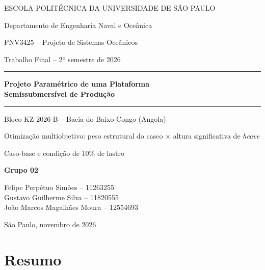 \documentclass[11pt,a4paper]{article}
\newcommand{\integrantes}{Felipe Perpétuo Simões -- 11263255\\[3pt]
  Gustavo Guilherme Silva -- 11820555\\[3pt]
  João Marcos Magalhães Moura -- 12554693}
\begin{document}
\hypersetup{pageanchor=false}
\begin{titlepage}
\centering
{\sffamily\large\color{azul} ESCOLA POLITÉCNICA DA UNIVERSIDADE DE SÃO PAULO\par}
{\sffamily\color{cinza} Departamento de Engenharia Naval e Oceânica\par}
\vspace{3cm}
{\sffamily\Large PNV3425 -- Projeto de Sistemas Oceânicos\par}
{\sffamily\color{cinza} Trabalho Final -- 2º semestre de 2026\par}
\vspace{1.4cm}
{\color{laranja}\rule{0.55\textwidth}{1.2pt}\par}
\vspace{0.6cm}
{\sffamily\LARGE\bfseries\color{azul} Projeto Paramétrico de uma Plataforma\\[6pt]
Semissubmersível de Produção\par}
\vspace{0.6cm}
{\color{laranja}\rule{0.55\textwidth}{1.2pt}\par}
\vspace{0.9cm}
{\Large Bloco KZ-2026-B -- Bacia do Baixo Congo (Angola)\par}
\vspace{0.4cm}
{\large Otimização multiobjetivo: peso estrutural do casco $\times$ altura significativa de
\emph{heave}\par}
\vspace{0.3cm}
{\color{cinza} Caso-base e condição de 10\% de lastro\par}
\vfill
{\sffamily\large\bfseries\color{azul} Grupo 02\par}
\vspace{0.4cm}
{\integrantes\par}
\vspace{2cm}
{\sffamily\color{cinza} São Paulo, novembro de 2026\par}
\end{titlepage}
\hypersetup{pageanchor=true}
\pagestyle{plain}

\section*{Resumo}
\end{document}

